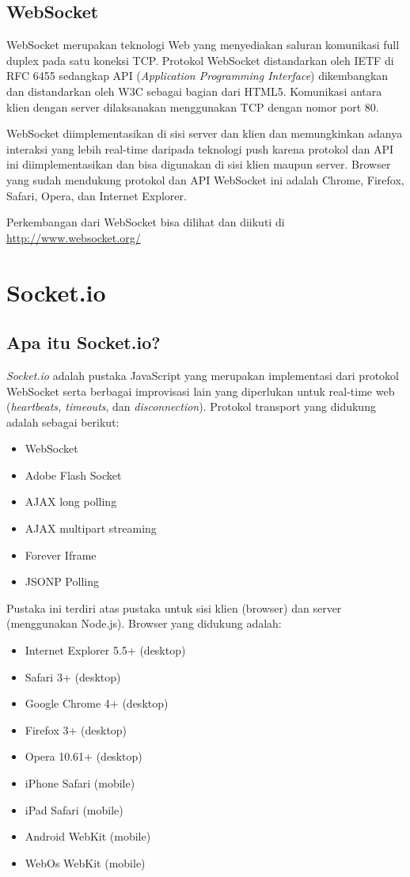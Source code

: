 \subsection{WebSocket}

WebSocket merupakan teknologi Web yang menyediakan saluran komunikasi full duplex pada satu koneksi TCP. Protokol WebSocket distandarkan oleh IETF di RFC 6455 sedangkap API (\textit{Application Programming Interface}) dikembangkan dan distandarkan oleh W3C sebagai bagian dari HTML5. Komunikasi antara klien dengan server dilaksanakan menggunakan TCP dengan nomor port 80.

WebSocket diimplementasikan di sisi server dan klien dan memungkinkan adanya interaksi yang lebih real-time daripada teknologi push karena protokol dan API ini diimplementasikan dan bisa digunakan di sisi klien maupun server. Browser yang sudah mendukung protokol dan API WebSocket ini adalah Chrome, Firefox, Safari, Opera, dan Internet Explorer. 

Perkembangan dari WebSocket bisa dilihat dan diikuti di \url{http://www.websocket.org/}

\section{Socket.io}

\subsection{Apa itu Socket.io?}

\textit{Socket.io} adalah pustaka JavaScript yang merupakan implementasi dari protokol WebSocket serta berbagai improvisasi lain yang diperlukan untuk real-time web (\textit{heartbeats, timeouts}, dan \textit{disconnection}). Protokol transport yang didukung adalah sebagai berikut:
\begin{itemize}
\item WebSocket
\item Adobe Flash Socket
\item AJAX long polling
\item AJAX multipart streaming
\item Forever Iframe
\item JSONP Polling
\end{itemize}
Pustaka ini terdiri atas pustaka untuk sisi klien (browser) dan server (menggunakan Node.js). Browser yang didukung adalah:
\begin{itemize}
\item Internet Explorer 5.5+ (desktop)
\item Safari 3+ (desktop)
\item Google Chrome 4+ (desktop)
\item Firefox 3+ (desktop)
\item Opera 10.61+ (desktop)
\item iPhone Safari (mobile)
\item iPad Safari (mobile)
\item Android WebKit (mobile)
\item WebOs WebKit (mobile)
\end{itemize}

